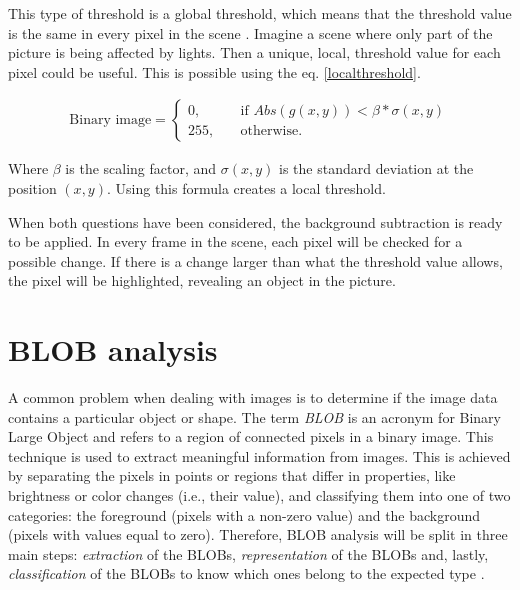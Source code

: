 {This type of threshold is a global threshold, which means that the threshold value is the same in every pixel in the scene \citep{ip_book}. Imagine a scene where only part of the picture is being affected by lights. Then a unique, local, threshold value for each pixel could be useful. This is possible using the eq. \ref{localthreshold}.

\begin{equation}
	\begin{aligned}
  		\ \text{Binary image} = \left\{ \begin{array}{ll}
         0, \quad &\text{if } Abs(g(x,y))<\beta * \sigma(x,y)\\
        255, \quad &\text{otherwise}.
        \end{array} \right . \ 
        \label{localthreshold}  
 	\end{aligned}
\end{equation} 

Where $\beta$ is the scaling factor, and $\sigma(x,y)$ is the standard deviation at the position $(x,y)$. Using this formula creates a local threshold.

When both questions have been considered, the background subtraction is ready to be applied. In every frame in the scene, each pixel will be checked for a possible change. If there is a change larger than what the threshold value allows, the pixel will be highlighted, revealing an object in the picture.

\section{BLOB analysis}\label{blob}
A common problem when dealing with images is to determine if the image data contains a particular object or shape. The term \textit{BLOB} is an acronym for Binary Large Object and refers to a region of connected pixels in a binary image. This technique is used to extract meaningful information from images. This is achieved by separating the pixels in points or regions that differ in properties, like brightness or color changes (i.e., their value), and classifying them into one of two categories: the foreground (pixels with a non-zero value) and the background (pixels with values equal to zero).
Therefore, BLOB analysis will be split in three main steps: \textit{extraction} of the BLOBs, \textit{representation} of the BLOBs and, lastly, \textit{classification} of the BLOBs to know which ones belong to the expected type \citep{ip_book}.

}
